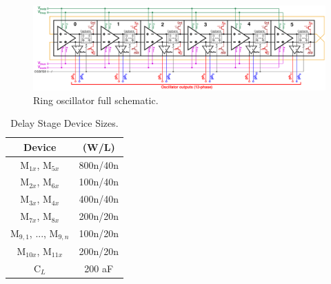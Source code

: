			\begin{figure}[htb!]
			        \centering
			        \includegraphics[width=1\textwidth, angle=90]{./figs/design/rosc_full_6stg}
			    \caption{Ring oscillator full schematic.}
			    \label{fig:full_6sg_ro}
			\end{figure}

		\begin{table}[h!]
			\centering
			\def\arraystretch{1.5}		
			\setlength\arrayrulewidth{0.75pt}
			\setlength{\tabcolsep}{1em} %
			\begin{tabular}{|c|c|}
				\hline 
				\rule[-1ex]{0pt}{2.5ex} \cellcolor{gray!40}\textbf{Device} & \cellcolor{gray!40}\textbf{(W/L)} \\ 
				\hline 
				\rule[-1ex]{0pt}{2.5ex} M$_{1x}$, M$_{5x}$ & 800n/40n\\ 
				\hline 
				\rule[-1ex]{0pt}{2.5ex} M$_{2x}$, M$_{6x}$ & 100n/40n\\ 
				\hline 
				\rule[-1ex]{0pt}{2.5ex} M$_{3x}$, M$_{4x}$ & 400n/40n\\ 
				\hline 
				\rule[-1ex]{0pt}{2.5ex} M$_{7x}$, M$_{8x}$ & 200n/20n\\ 
				\hline 
				\rule[-1ex]{0pt}{2.5ex} M$_{9,1}$, ..., M$_{9,n}$ & 100n/20n\\ 
				\hline 
				\rule[-1ex]{0pt}{2.5ex} M$_{10x}$, M$_{11x}$ & 200n/20n\\ 
				\hline 
				\rule[-1ex]{0pt}{2.5ex} C$_L$ & 200 aF\\ 
				\hline 
			\end{tabular} 
			\caption{Delay Stage Device Sizes.}
			\label{tab:dly_dev_size}
		\end{table}  



